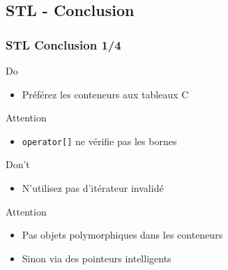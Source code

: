 \documentclass[C++.tex]{subfiles}
\begin{document}
\subsection*{STL - Conclusion}
\begin{frame}
	\frametitle{STL Conclusion \titlehfill{}1/4}
	\begin{exampleblock}{Do}
		\begin{itemize}
			\item Préférez les conteneurs aux tableaux C
		\end{itemize}
	\end{exampleblock}

	\begin{alertblock}{Attention}
		\begin{itemize}
			\item \lstinline|operator[]| ne vérifie pas les bornes
		\end{itemize}

	\end{alertblock}

	\begin{alertblock}{Don't}
		\begin{itemize}
			\item N'utilisez pas d'itérateur invalidé
		\end{itemize}

	\end{alertblock}

	\begin{alertblock}{Attention}
		\begin{itemize}
			\item Pas objets polymorphiques dans les conteneurs
			\item Sinon via des pointeurs intelligents
		\end{itemize}
	\end{alertblock}
\end{frame}
\end{document}
